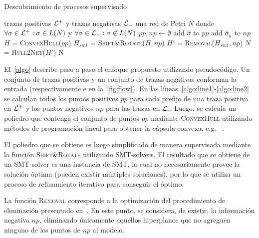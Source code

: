 \begin{algorithm}[H]
\caption{Descubrimiento de procesos supervisado}
  \begin{algorithmic}[1]
      \Require trazas positivas ${\mathcal L}^+$ y trazas negativas ${\mathcal L}_-$
      \Ensure una red de Petri $N$ donde $\forall \sigma \in {\mathcal L}^+: \sigma \in L(N)$ y $\forall \sigma \in {\mathcal L}_-: \sigma \not \in L(N)$
      \vspace{1pt}
      \State $pp, np \leftarrow \emptyset$ \label{algo:line1}
          \State add $\widehat\sigma$ to $pp$
       \EndFor
     \EndFor
        \State add $\widehat\sigma_n$ to $np$
      \EndFor \label{algo:line2}
      \State $H$ = \textsc{ConvexHull}($pp$) \label{algo:lineqhull}
      \State $H_{smt}$ = \textsc{Shift\&Rotate}($H, np$)
      \State $H'$ = \textsc{Removal}($H_{smt}, np$)
      \State $N$ = \textsc{Hull2Net}($H'$)
      \State \Return N
      \EndProcedure
  \end{algorithmic}
  \label{algo}
\end{algorithm}

El~\autoref{algo} describe paso a paso el enfoque propuesto utilizando pseudocódigo. Un conjunto de trazas 
positivas y un conjunto de trazas negativas conforman la entrada 
(respectivamente  e  en la~\autoref{fig:flow}). 
En las líneas~\ref{algo:line1}-\ref{algo:line2} se calculan todos los puntos positivos $pp$ para
cada prefijo de una traza positiva en ${\mathcal L}\textsuperscript{+}$ y los puntos negativos $np$ para las trazas en ${\mathcal L}\textsubscript{-}$\footnotemark[1].
Luego, se calcula un poliedro que contenga el conjunto de puntos $pp$ mediante \textsc{ConvexHull} utilizando 
métodos de programación lineal para obtener la cápsula convexa, e.g. \qhulltool~\cite{Barber96}.

El poliedro que se obtiene es luego simplificado de manera supervisada mediante la función 
\textsc{Shift\&Rotate} utilizando SMT-solvers. El resultado que se obtiene de un SMT-solver es 
una instancia de SMT, la cual no necesariamente provee la solución óptima (pueden existir múltiples soluciones), 
por lo que se utiliza un proceso de refinamiento iterativo para conseguir el óptimo.

La función \textsc{Removal} corresponde a la optimización del procedimiento de eliminación presentado en~\cite{LeonCB15}.
En este punto, se considera, de existir, la información negativa $np$, eliminando únicamente aquellos hiperplanos
que no agreguen ninguno de los puntos de $np$ al modelo.

